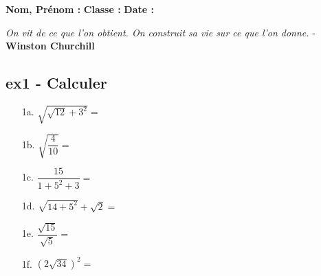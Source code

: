 \documentclass[12pt]{article}
\begin{document}

\newtheorem{Definition}{Définition}
\newtheorem{Theorem}{Théorème}
\newtheorem{Proposition}{Propriété}

\renewcommand{\labelitemi}{$\bullet$}
\renewcommand{\labelitemii}{$\circ$}
\newcommand{\Pointilles}[1][3]{%
  \multido{}{#1}{\makebox[\linewidth]{\dotfill}\\[\parskip]
}}


\setlength{\columnseprule}{1pt}

\textbf{Nom, Prénom :} \hspace{8cm} \textbf{Classe :} \hspace{3cm} \textbf{Date :}\\
\vspace{-0.2cm}
\begin{center}
  \textit{On vit de ce que l’on obtient. On construit sa vie sur ce que l’on donne.}  - \textbf{Winston Churchill}
\end{center}
\vspace{-0.2cm}


\subsection*{ex1 - Calculer}
\begin{multicols}{3}
\begin{enumerate}
\item[1a.] $\sqrt{\sqrt{12} + 3^2} = $ \dotfill\\
\item[1b.] $\sqrt{\dfrac{4}{10}} = $ \dotfill\\
\item[1c.] $\dfrac{15}{1+ 5^2 + 3} = $ \dotfill \\
\item[1d.] $ \sqrt{14 + 5^2} + \sqrt{2} = $ \dotfill\\
\item[1e.] $\dfrac{\sqrt{15}}{\sqrt{5}} = $ \dotfill \\
\item[1f.] $(2\sqrt{34})^2 = $ \dotfill 
\end{enumerate}
\end{multicols}
\end{document}
